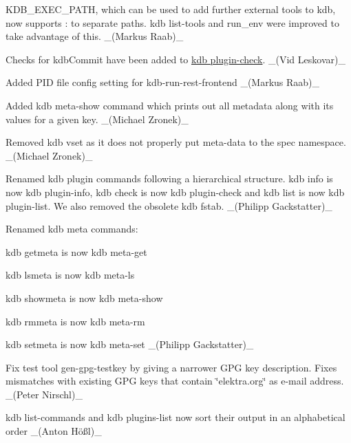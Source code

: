 \begin{DoxyItemize}
\item {\ttfamily K\+D\+B\+\_\+\+E\+X\+E\+C\+\_\+\+P\+A\+TH}, which can be used to add further external tools to {\ttfamily kdb}, now supports {\ttfamily \+:} to separate paths. {\ttfamily kdb list-\/tools} and {\ttfamily run\+\_\+env} were improved to take advantage of this. \+\_\+(\+Markus Raab)\+\_\+
\item Checks for {\ttfamily kdb\+Commit} have been added to \hyperlink{doc_help_kdb-plugin-check_md}{kdb plugin-\/check}. \+\_\+(\+Vid Leskovar)\+\_\+
\item Added P\+ID file config setting for kdb-\/run-\/rest-\/frontend \+\_\+(\+Markus Raab)\+\_\+
\item Added {\ttfamily kdb meta-\/show} command which prints out all metadata along with its values for a given key. \+\_\+(\+Michael Zronek)\+\_\+
\item Removed {\ttfamily kdb vset} as it does not properly put meta-\/data to the spec namespace. \+\_\+(\+Michael Zronek)\+\_\+
\item Renamed kdb plugin commands following a hierarchical structure. {\ttfamily kdb info} is now {\ttfamily kdb plugin-\/info}, {\ttfamily kdb check} is now {\ttfamily kdb plugin-\/check} and {\ttfamily kdb list} is now {\ttfamily kdb plugin-\/list}. We also removed the obsolete {\ttfamily kdb fstab}. \+\_\+(\+Philipp Gackstatter)\+\_\+
\item Renamed kdb meta commands\+:
\begin{DoxyItemize}
\item {\ttfamily kdb getmeta} is now {\ttfamily kdb meta-\/get}
\item {\ttfamily kdb lsmeta} is now {\ttfamily kdb meta-\/ls}
\item {\ttfamily kdb showmeta} is now {\ttfamily kdb meta-\/show}
\item {\ttfamily kdb rmmeta} is now {\ttfamily kdb meta-\/rm}
\item {\ttfamily kdb setmeta} is now {\ttfamily kdb meta-\/set} \+\_\+(\+Philipp Gackstatter)\+\_\+
\end{DoxyItemize}
\item Fix test tool {\ttfamily gen-\/gpg-\/testkey} by giving a narrower G\+PG key description. Fixes mismatches with existing G\+PG keys that contain \char`\"{}elektra.\+org\char`\"{} as e-\/mail address. \+\_\+(\+Peter Nirschl)\+\_\+
\item {\ttfamily kdb list-\/commands} and {\ttfamily kdb plugins-\/list} now sort their output in an alphabetical order \+\_\+(Anton Hößl)\+\_\+

\end{DoxyItemize}
